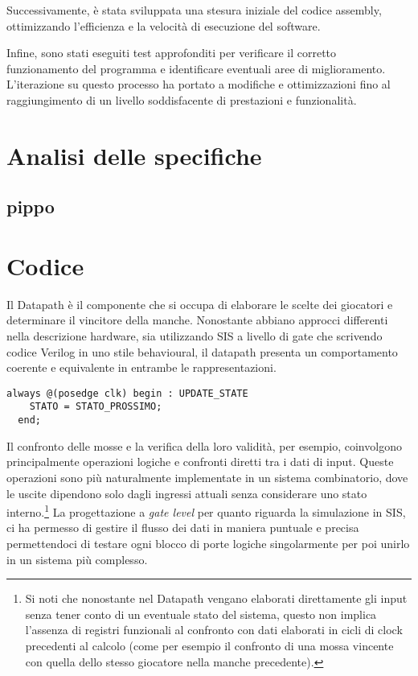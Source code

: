 \documentclass[a4paper]{report}
\begin{document}
Successivamente, è stata sviluppata una stesura iniziale del codice assembly,
ottimizzando l'efficienza e la velocità di esecuzione del software.

Infine, sono stati eseguiti test approfonditi per verificare il corretto
funzionamento del programma e identificare eventuali aree di miglioramento.
L'iterazione su questo processo ha portato a modifiche e ottimizzazioni
fino al raggiungimento di un livello soddisfacente di prestazioni e funzionalità.

\section{Analisi delle specifiche}
\subsection{pippo}


\section{Codice}

Il Datapath è il componente che si occupa di elaborare le scelte dei giocatori e determinare il vincitore della manche.
Nonostante abbiano approcci differenti nella descrizione hardware, sia utilizzando SIS a livello di gate che scrivendo codice Verilog in uno stile behavioural, il datapath presenta un comportamento coerente e equivalente in entrambe le rappresentazioni.

\begin{lstlisting}[firstnumber=34]
  always @(posedge clk) begin : UPDATE_STATE
    STATO = STATO_PROSSIMO;
  end;

\end{lstlisting}


\vspace{20pt}

Il confronto delle mosse e la verifica della loro validità, per esempio, coinvolgono principalmente operazioni logiche e confronti diretti tra i dati di input.
Queste operazioni sono più naturalmente implementate in un sistema combinatorio, dove le uscite dipendono solo dagli ingressi attuali senza considerare uno stato interno.\footnote{Si noti che nonostante nel Datapath vengano elaborati direttamente gli input senza tener conto di un eventuale stato del sistema, questo non implica l'assenza di registri funzionali al confronto con dati elaborati in cicli di clock precedenti al calcolo (come per esempio il confronto di una mossa vincente con quella dello stesso giocatore nella manche precedente).}
La progettazione a \textit{gate level} per quanto riguarda la simulazione in SIS, ci ha permesso di gestire il flusso dei dati in maniera puntuale e precisa permettendoci di testare ogni blocco di porte logiche singolarmente per poi unirlo in un sistema più complesso. 
\end{document}
